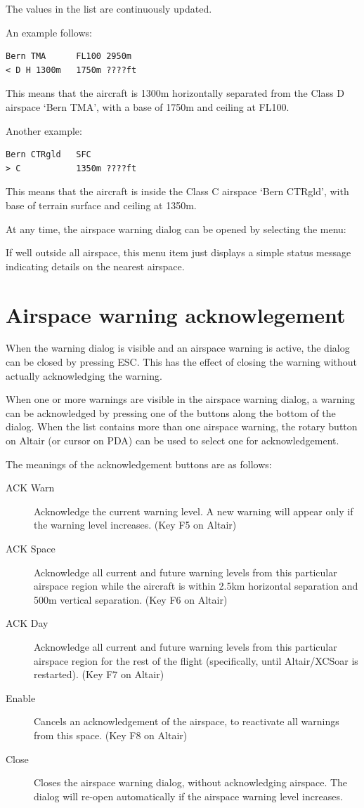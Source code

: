 \documentclass[a4paper,12pt]{refrep}
\begin{document}
The values in the list are continuously updated. 

An example follows:
\begin{verbatim}
Bern TMA      FL100 2950m
< D H 1300m   1750m ????ft
\end{verbatim}

This means that the aircraft is 1300m horizontally separated from the Class D airspace
`Bern TMA', with a base of 1750m and ceiling at FL100.

Another example:
\begin{verbatim}
Bern CTRgld   SFC
> C           1350m ????ft
\end{verbatim}

This means that the aircraft is inside the Class C airspace `Bern
CTRgld', with base of terrain surface and ceiling at 1350m.

At any time, the airspace warning dialog can be opened by selecting
the menu:

\blink{}

If well outside all airspace, this menu item just displays a simple
status message indicating details on the nearest airspace.

\section{Airspace warning acknowlegement}

When the warning dialog is visible and an airspace warning is active, the
dialog can be closed by pressing ESC.  This has the effect of closing the
warning without actually acknowledging the warning.  

When one or more warnings are visible in the airspace warning dialog,
a warning can be acknowledged by pressing one of the buttons along the bottom
of the dialog.  When the list contains more than one airspace warning,
the rotary button on Altair (or cursor on PDA) can be used to select one
for acknowledgement.

The meanings of the acknowledgement buttons are as follows:
\begin{description}
\item[ACK Warn]  Acknowledge the current warning level.  A new warning will appear
only if the warning level increases.  (Key F5 on Altair)
\item[ACK Space]  Acknowledge all current and future warning levels from this 
particular airspace region while the aircraft is within 2.5km horizontal separation
and 500m vertical separation. (Key F6 on Altair)
\item[ACK Day]  Acknowledge all current and future warning levels from this particular
airspace region for the rest of the flight (specifically, until Altair/XCSoar 
is restarted). (Key F7 on Altair)
\item[Enable]  Cancels an acknowledgement of the airspace, to reactivate all warnings
from this space. (Key F8 on Altair)
\item[Close] Closes the airspace warning dialog, without acknowledging airspace.
  The dialog will re-open automatically if the airspace warning level increases.
\end{description}
\end{document}
